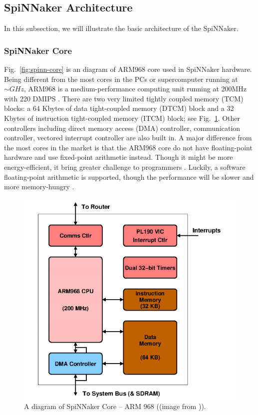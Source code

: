 \subsection{SpiNNaker Architecture} \label{sec:sa}
In this subsection, we will illustrate the basic architecture of the SpiNNaker.
\subsubsection{SpiNNaker Core} \label{sec:ca}

Fig.~\ref{fig:spinn-core} is an diagram of ARM968 core used in SpiNNaker hardware. Being different from the most cores in the PCs or supercomputer running at $\sim GHz$, ARM968 is a medium-performance computing unit running at 200MHz with 220 DMIPS \cite{furber2012overview}. There are two very limited tightly coupled memory (TCM) blocks: a 64 Kbytes of data tight-coupled memory (DTCM) block and a 32 Kbytes of instruction tight-coupled memory (ITCM) block; see Fig.~\ref{fig:arm_968}. Other controllers including direct memory access (DMA) controller, communication controller, vectored interrupt controller are also built in. A major difference from the most cores in the market is that the ARM968 core do not have floating-point hardware and use fixed-point arithmetic instead. Though it might be more energy-efficient, it bring greater challenge to programmers \cite{furber2012overview}. Luckily, a software floating-point arithmetic is supported, though the performance will be slower and more memory-hungry \cite{spin-chip-resources}.
    \begin{figure}[!tb]
   \centering
       \includegraphics[width=1\textwidth]{figures/core.png}
       \caption{A diagram of SpiNNaker Core -- ARM 968 ((image from \cite{spin-chip-resources})).}
       \label{fig:arm_968}
    \end{figure}

